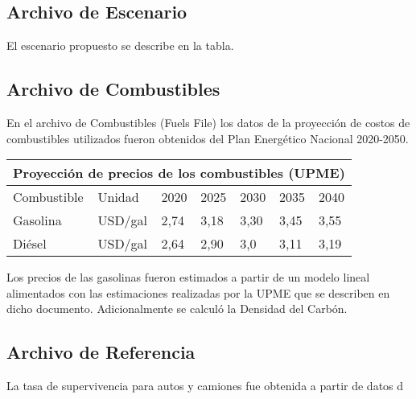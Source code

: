 \subsection{Archivo de Escenario}

\begin{center}
\end{center}

El escenario propuesto se describe en la tabla.

\subsection{Archivo de Combustibles}

En el archivo de Combustibles (Fuels File) los datos de la proyección de costos de combustibles utilizados fueron obtenidos del Plan Energético Nacional 2020-2050. \cite{Plan_Energetico-2050}

\begin{center}
\begin{tabular}{ |p{3cm}||p{2cm}||p{1cm}||p{1cm}||p{1cm}||p{1cm}||p{1cm}|}
 \hline
 \multicolumn{7}{|c|}{Proyección de precios de los combustibles (UPME)} \\
 \hline
 Combustible & Unidad & 2020 & 2025 & 2030 & 2035 & 2040 \\
 \hline
    Gasolina & USD/gal & 2,74 & 3,18 & 3,30 & 3,45 & 3,55 \\
    Diésel & USD/gal & 2,64  & 2,90 &  3,0 &  3,11 &  3,19 \\
 \hline
\end{tabular}
\end{center}

 Los precios de las gasolinas fueron estimados a partir de un modelo lineal alimentados con las estimaciones realizadas por la UPME que se describen en dicho documento.\cite{Plan_Energetico-2050}
 Adicionalmente se calculó la Densidad del Carbón.

\subsection{Archivo de Referencia}

\begin{center}
\end{center}

La tasa de supervivencia para autos y camiones fue obtenida a partir de datos d\cite{Baseline_Pereira_2020}

